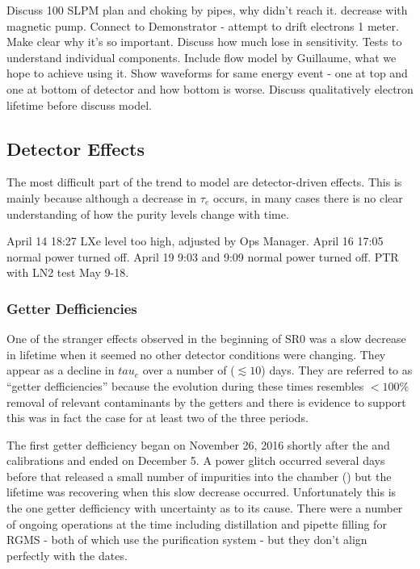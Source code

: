Discuss 100 SLPM plan and choking by pipes, why didn't reach it.   decrease with magnetic
pump.  Connect to Demonstrator - attempt to drift electrons 1 meter.  Make clear why it's so important.  Discuss how much lose in
sensitivity.  Tests to understand individual components.  Include flow model by Guillaume, what we hope to achieve using it.  Show
waveforms for same energy event - one at top and one at bottom of detector and how bottom is worse.  Discuss qualitatively electron
lifetime before discuss model.



\subsection{Detector Effects}
\label{subsec:electron_lifetime_model_detector_effects}
The most difficult part of the trend to model are detector-driven effects.  This is mainly because although a decrease in $\tau_e$ occurs,
in many cases there is no clear understanding of how the purity levels change with time.

April 14 18:27 LXe level too high, adjusted by Ops Manager.  April 16 17:05 normal power turned off.  April 19 9:03 and 9:09 normal power
turned off.  PTR with LN2 test May 9-18.



\subsubsection{Getter Defficiencies}
\label{subsubsec:electron_lifetime_model_detector_effects_getter}
One of the stranger effects observed in the beginning of SR0 was a slow decrease in lifetime when it seemed no other detector conditions
were changing.  They
appear as a decline in $tau_e$ over a number of ($\lesssim 10$) days.  They are referred to as ``getter defficiencies'' because the
evolution during these times resembles $< 100\%$ removal of relevant
contaminants by the getters and there is evidence to support this was in fact the case for at least two of the three periods.

The first getter defficiency
began on November 26, 2016 shortly after the \ambe and \metakr calibrations and ended on December 5.  A power glitch occurred several
days before that released a small number of impurities into the chamber
() but the lifetime was recovering when this slow decrease
occurred.  Unfortunately this is the one getter defficiency with uncertainty as to its cause.  There were a number of ongoing operations
at the time including  distillation and pipette filling for RGMS - both of which use the purification system - but they don't
align perfectly with the dates.

